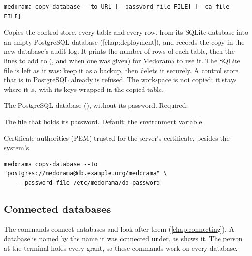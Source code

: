 \begin{lstlisting}[style=signature]
medorama copy-database --to URL [--password-file FILE] [--ca-file FILE]
\end{lstlisting}
Copies the control store, every table and every row, from its SQLite database into an empty
PostgreSQL database (\cref{chap:deployment}), and records the copy in the new database's audit
log. It prints the number of rows of each table, then the lines to add to 
(, and  when one was given) for Medorama to
use it. The SQLite file is left as it was: keep it as a backup, then delete it securely. A
control store that is in PostgreSQL already is refused. The workspace is not copied: it stays
where it is, with its keys wrapped in the copied  table.
\begin{params}
\item[--to URL] The PostgreSQL database (),
  without its password. Required.
\item[--password-file FILE] The file that holds its password. Default: the environment variable
  .
\item[--ca-file FILE] Certificate authorities (PEM) trusted for the server's certificate,
  besides the system's.
\end{params}
\begin{lstlisting}[style=shell]
medorama copy-database --to "postgres://medorama@db.example.org/medorama" \
    --password-file /etc/medorama/db-password
\end{lstlisting}

\subsection{Connected databases}
\label{sec:cli-data}

The commands  connect databases and look after them
(\cref{chap:connecting}). A database is named by the name it was connected under, as
\cmd{databases list} shows it. The person at the terminal holds every grant, so these commands
work on every database.

